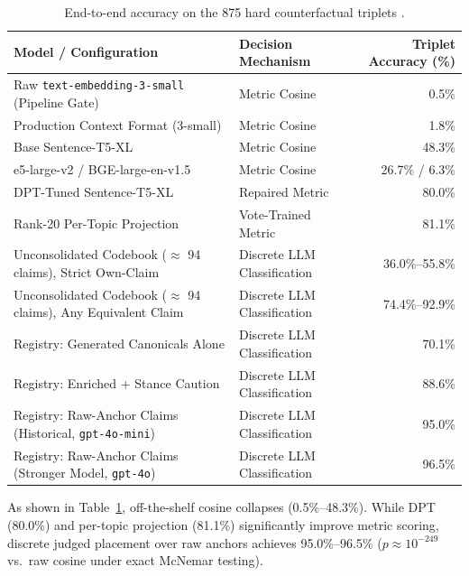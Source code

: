 \documentclass{article}
\begin{document}
\begin{table}[t]
\centering
\caption{End-to-end accuracy on the 875 hard counterfactual triplets \citep{blair2026embeddings}.}
\label{tab:triplets}
\small
\begin{tabular}{@{}llr@{}}
\toprule
Model / Configuration & Decision Mechanism & Triplet Accuracy (\%) \\
\midrule
Raw \texttt{text-embedding-3-small} (Pipeline Gate) & Metric Cosine & 0.5\% \\
Production Context Format (3-small) & Metric Cosine & 1.8\% \\
Base Sentence-T5-XL \citep{blair2026embeddings} & Metric Cosine & 48.3\% \\
e5-large-v2 / BGE-large-en-v1.5 & Metric Cosine & 26.7\% / 6.3\% \\
DPT-Tuned Sentence-T5-XL \citep{blair2026embeddings} & Repaired Metric & 80.0\% \\
Rank-20 Per-Topic Projection \citep{blair2026embeddings} & Vote-Trained Metric & 81.1\% \\
\midrule
Unconsolidated Codebook ($\approx$ 94 claims), Strict Own-Claim & Discrete LLM Classification & 36.0\%--55.8\% \\
Unconsolidated Codebook ($\approx$ 94 claims), Any Equivalent Claim & Discrete LLM Classification & 74.4\%--92.9\% \\
\midrule
Registry: Generated Canonicals Alone & Discrete LLM Classification & 70.1\% \\
Registry: Enriched + Stance Caution & Discrete LLM Classification & 88.6\% \\
Registry: Raw-Anchor Claims (Historical, \texttt{gpt-4o-mini}) & Discrete LLM Classification & 95.0\% \\
Registry: Raw-Anchor Claims (Stronger Model, \texttt{gpt-4o}) & Discrete LLM Classification & 96.5\% \\
\bottomrule
\end{tabular}
\end{table}

As shown in Table~\ref{tab:triplets}, off-the-shelf cosine collapses (0.5\%--48.3\%). While DPT (80.0\%) and per-topic projection (81.1\%) significantly improve metric scoring, discrete judged placement over raw anchors achieves 95.0\%--96.5\% ($p \approx 10^{-249}$ vs.\ raw cosine under exact McNemar testing).
\end{document}

